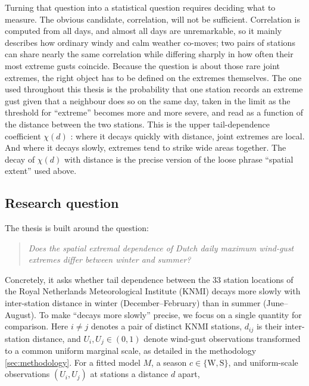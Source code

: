 Turning that question into a statistical question requires deciding what to measure. The obvious candidate, correlation, will not be sufficient. Correlation is computed from all days, and almost all days are unremarkable, so it mainly describes how ordinary windy and calm weather co-moves; two pairs of stations can share nearly the same correlation while differing sharply in how often their most extreme gusts coincide. Because the question is about those rare joint extremes, the right object has to be defined on the extremes themselves. The one used throughout this thesis is the probability that one station records an extreme gust given that a neighbour does so on the same day, taken in the limit as the threshold for ``extreme'' becomes more and more severe, and read as a function of the distance between the two stations. This is the upper tail-dependence coefficient \(\chi(d)\) \citep{coles1999}: where it decays quickly with distance, joint extremes are local. And where it decays slowly, extremes tend to strike wide areas together. The decay of \(\chi(d)\) with distance is the precise version of the loose phrase ``spatial extent'' used above.

\subsection{Research question}\label{sec:intro-rq}

The thesis is built around the question:

\begin{quote}\itshape
    Does the spatial extremal dependence of Dutch daily maximum wind-gust extremes differ between winter and summer?
\end{quote}

Concretely, it asks whether tail dependence between the \(33\) station locations of the Royal Netherlands Meteorological Institute (KNMI) decays more slowly with inter-station distance in winter (December--February) than in summer (June--August). To make ``decays more slowly'' precise, we focus on a single quantity for comparison.
Here \(i\neq j\) denotes a pair of distinct KNMI stations, \(d_{ij}\) is their inter-station distance, and \(U_i,U_j\in(0,1)\) denote wind-gust observations transformed to a common uniform marginal scale, as detailed in the methodology \ref{sec:methodology}. For a fitted model \(M\), a season \(c\in\{\mathrm W,\mathrm S\}\), and uniform-scale observations \((U_i,U_j)\) at stations a distance \(d\) apart,

